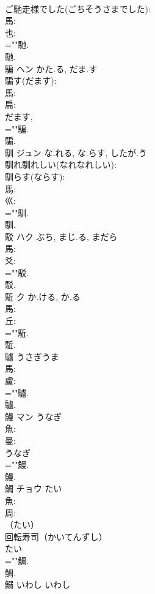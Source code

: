 \documentclass[8pt]{extreport}
\begin{document}
\begin{CJK}{UTF8}{min}
\\	ご馳走様でした(ごちそうさまでした): 
\\	馬: 
\\	也: 
\\	=""馳.
\\	馳.
\\	騙	ヘン	かた.る, だま.す		
\\	騙す(だます): 
\\	馬: 
\\	扁: 
\\	だます, 
\\	=""騙.
\\	騙.
\\	馴	ジュン	な.れる, な.らす, したが.う		
\\	馴れ馴れしい(なれなれしい): 
\\	馴らす(ならす): 
\\	馬: 
\\	巛: 
\\	=""馴.
\\	馴.
\\	駁	ハク	ぶち, まじ.る, まだら		
\\	馬: 
\\	爻: 
\\	=""駁.
\\	駁.
\\	駈	ク	か.ける, か.る		
\\	馬: 
\\	丘: 
\\	=""駈.
\\	駈.
\\	驢		うさぎうま				
\\	馬: 
\\	盧: 
\\	=""驢.
\\	驢.
\\	鰻	マン	うなぎ		
\\	魚: 
\\	曼: 
\\	うなぎ 
\\	=""鰻.
\\	鰻.
\\	鯛	チョウ	たい		
\\	魚: 
\\	周: 
\\	（たい） 
\\	回転寿司（かいてんずし） 
\\	たい
\\	=""鯛.
\\	鯛.
\\	鰯	いわし	いわし		

\end{CJK}
\end{document}
